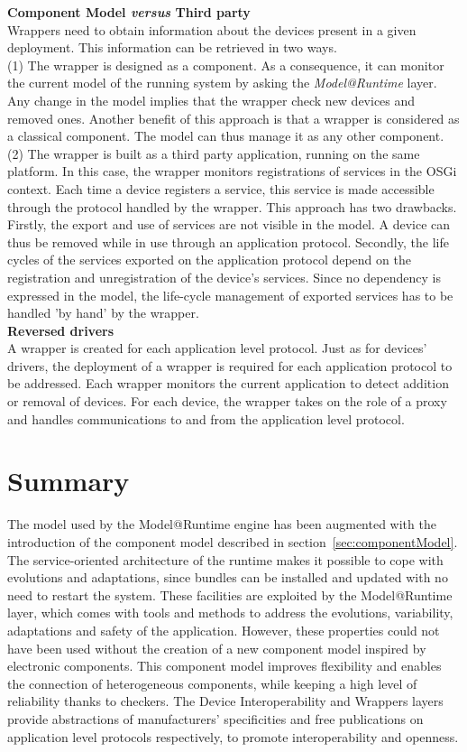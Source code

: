 {\bf Component Model {\it versus} Third party}\\
Wrappers need to obtain information about the devices present in a given deployment. This information can be retrieved in two ways.\\
(1) The wrapper is designed as a component. As a consequence, it can monitor the current model of the running system by asking the {\it Model@Runtime} layer. Any change in the model implies that the wrapper check new devices and removed ones. Another benefit of this approach is that a wrapper is considered as a classical component. The model can thus manage it as any other component.\\
(2) The wrapper is built as a third party application, running on the same platform. In this case, the wrapper monitors registrations of services in the OSGi context. Each time a device registers a service, this service is made accessible through the protocol handled by the wrapper. This approach has two drawbacks. Firstly, the export and use of services are not visible in the model. A device can thus be removed while in use through an application protocol. Secondly, the life cycles of the services exported on the application protocol depend on the registration and unregistration of the device's services. Since no dependency is expressed in the model, the life-cycle management of exported services has to be handled 'by hand' by the wrapper.\\

{\bf Reversed drivers}\\
A wrapper is created for each application level protocol. Just as for devices' drivers, the deployment of a wrapper is required for each application protocol to be addressed. Each wrapper monitors the current application to detect addition or removal of devices. For each device, the wrapper takes on the role of a proxy and handles communications to and from the application level protocol.


\section{Summary}
The model used by the Model@Runtime engine has been augmented with the introduction of the component model described in section~\ref{sec:componentModel}.\\
The service-oriented architecture of the runtime makes it possible to cope with evolutions and adaptations, since bundles can be installed and updated with no need to restart the system. These facilities are exploited by the Model@Runtime layer, which comes with tools and methods to address the evolutions, variability, adaptations and safety of the application. However, these properties could not have been used without the creation of a new component model inspired by electronic components. This component model improves flexibility and enables the connection of heterogeneous components, while keeping a high level of reliability thanks to checkers. The Device Interoperability and Wrappers layers provide abstractions of manufacturers' specificities and free publications on application level protocols respectively, to promote interoperability and openness.

